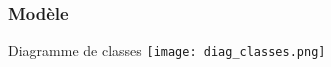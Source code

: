
\begin{frame}
\frametitle{Modèle}
  \begin{block}{Diagramme de classes}  
    \texttt{[image: diag\_classes.png]}
  \end{block}  
\end{frame}

